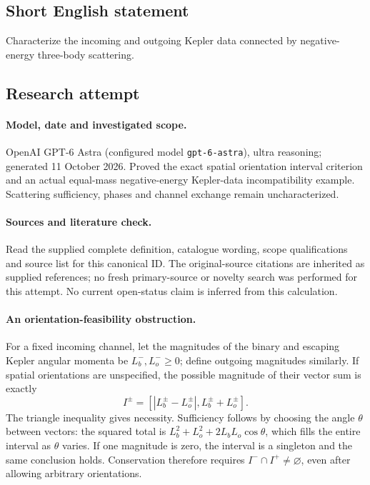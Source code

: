 \documentclass[11pt]{article}
\begin{document}
\subsection{Short English statement}
Characterize the incoming and outgoing Kepler data connected by negative-energy three-body scattering.
\subsection{Research attempt}
\paragraph{Model, date and investigated scope.}
OpenAI GPT-6 Astra (configured model \texttt{gpt-6-astra}), ultra reasoning; generated 11 October 2026. Proved the exact spatial orientation interval criterion and an actual equal-mass negative-energy Kepler-data incompatibility example. Scattering sufficiency, phases and channel exchange remain uncharacterized.

\paragraph{Sources and literature check.}
Read the supplied complete definition, catalogue wording, scope qualifications and source list for this canonical ID. The original-source citations are inherited as supplied references; no fresh primary-source or novelty search was performed for this attempt. No current open-status claim is inferred from this calculation.

\paragraph{An orientation-feasibility obstruction.}For a fixed incoming channel, let the magnitudes of the binary and escaping Kepler angular momenta be \(L_b^-,L_o^-\ge0\); define outgoing magnitudes similarly. If spatial orientations are unspecified, the possible magnitude of their vector sum is exactly
\[I^\pm=[|L_b^\pm-L_o^\pm|,L_b^\pm+L_o^\pm].
\]
The triangle inequality gives necessity. Sufficiency follows by choosing the angle \(\theta\) between vectors: the squared total is \(L_b^2+L_o^2+2L_bL_o\cos\theta\), which fills the entire interval as \(\theta\) varies. If one magnitude is zero, the interval is a singleton and the same conclusion holds. Conservation therefore requires \(I^-\cap I^+\ne\varnothing\), even after allowing arbitrary orientations.
\end{document}
